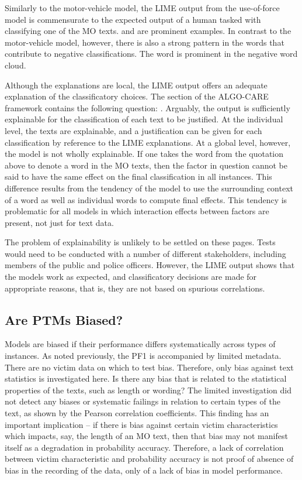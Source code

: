 Similarly to the motor-vehicle model, the LIME output from the use-of-force model is commensurate to the expected output of a human tasked with classifying one of the MO texts.  and  are prominent examples. In contrast to the motor-vehicle model, however, there is also a strong pattern in the words that contribute to negative classifications. The word  is prominent in the negative word cloud.

Although the explanations are local, the LIME output offers an adequate explanation of the classificatory choices. The  section of the ALGO-CARE framework contains the following question: . Arguably, the output is sufficiently explainable for the classification of each text to be justified. At the individual level, the texts are explainable, and a justification can be given for each classification by reference to the LIME explanations. At a global level, however, the model is not wholly explainable. If one takes the word  from the quotation above to denote a word in the MO texts, then the factor in question cannot be said to have the same effect on the final classification in all instances. This difference results from the tendency of the model to use the surrounding context of a word as well as individual words to compute final effects. This tendency is problematic for all models in which interaction effects between factors are present, not just for text data.

The problem of explainability is unlikely to be settled on these pages. Tests would need to be conducted with a number of different stakeholders, including members of the public and police officers. However, the LIME output shows that the models work as expected, and classificatory decisions are made for appropriate reasons, that is, they are not based on spurious correlations.


\subsection{Are PTMs Biased?} Models are biased if their performance differs systematically across types of instances. As noted previously, the PF1 is accompanied by limited metadata. There are no victim data on which to test bias. Therefore, only bias against text statistics is investigated here. Is there any bias that is related to the statistical properties of the texts, such as length or wording? The limited investigation did not detect any biases or systematic failings in relation to certain types of the text, as shown by the Pearson correlation coefficients. This finding has an important implication – if there is bias against certain victim characteristics which impacts, say, the length of an MO text, then that bias may not manifest itself as a degradation in probability accuracy. Therefore, a lack of correlation between victim characteristic and probability accuracy is not proof of absence of bias in the recording of the data, only of a lack of bias in model performance.


